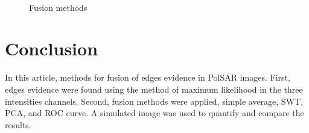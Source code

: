 \documentclass[conference]{IEEEtran}
\begin{document}
\begin{figure}[hbt]
	\centering
     \\
     \caption{Fusion methods}
     \label{fusion_met}
\end{figure}

\section{Conclusion}\label{sec_09}

In this article, methods for fusion of edges evidence in PolSAR images. 
First, edges evidence were found using the method of maximum likelihood in the three intensities channels. 
Second, fusion methods were applied, simple average, SWT, PCA, and ROC curve. A simulated image was used to quantify and compare the results. 
\end{document}

